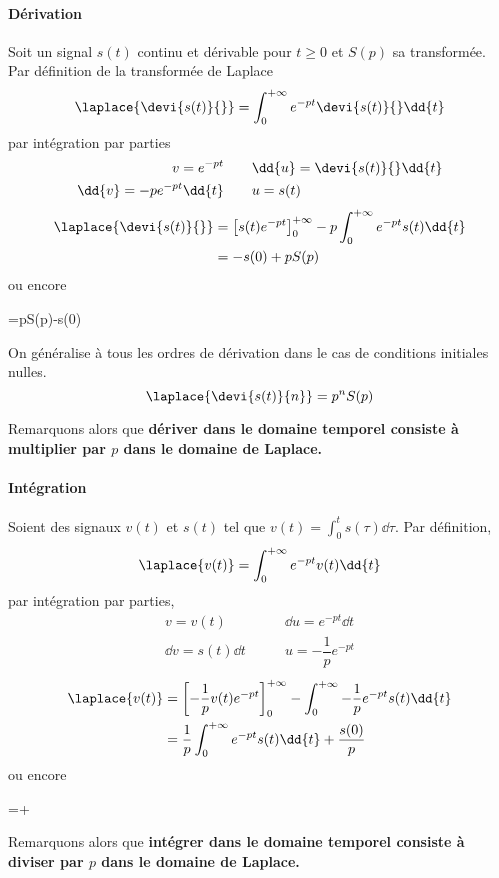 \paragraph{Dérivation}
Soit un signal $s(t)$ continu et dérivable pour $t\ge0$ et $S(p)$ sa transformée.
Par définition de la transformée de Laplace 
$$
\laplace{\devi{s(t)}{}}=\int_{0}^{+\infty} e^{-pt}\devi{s(t)}{}\dd{t}
$$
par intégration par parties
\begin{align*}
    v=e^{-pt}\qquad&\dd{u}=\devi{s(t)}{}\dd{t}\\
    \dd{v}=-pe^{-pt}\dd{t}\qquad&u=s(t)
\end{align*}
\begin{align*}
    \laplace{\devi{s(t)}{}}&=\left[s(t)e^{-pt}\right]_0^{+\infty}-p\int_{0}^{+\infty} e^{-pt}s(t)\dd{t} \\
                           &=-s(0)+pS(p)
\end{align*}
ou encore
\begin{bequation}
    =pS(p)-s(0)
\end{bequation}
On généralise à tous les ordres de dérivation dans le cas de conditions initiales nulles.
$$
\laplace{\devi{s(t)}{n}}=p^nS(p)
$$

Remarquons alors que \textbf{dériver dans le domaine temporel consiste à multiplier par 
$p$ dans le domaine de Laplace.}
\paragraph{Intégration}
Soient  des signaux $v(t)$ et $s(t)$ tel que $v(t)=\int_{0}^{t}s(\tau)\dd{\tau}$. 
Par définition,
$$
\laplace{v(t)}=\int_{0}^{+\infty} e^{-pt}v(t)\dd{t}
$$
par intégration par parties,
\begin{align*}
    v=v(t)\qquad&\dd{u}=e^{-pt}\dd{t}\\
    \dd{v}=s(t)\dd{t}\qquad&u=-\dfrac{1}{p}e^{-pt}
\end{align*} 
\begin{align*}
    \laplace{v(t)}&=\left[-\dfrac{1}{p}v(t)e^{-pt}\right]_0^{+\infty}-\int_{0}^{+\infty} -\dfrac{1}{p}e^{-pt}s(t)\dd{t} \\
    &=\dfrac{1}{p}\int_{0}^{+\infty} e^{-pt}s(t)\dd{t}+\dfrac{s(0)}{p}
\end{align*}
ou encore
\begin{bequation}
    =+
\end{bequation}
Remarquons alors que \textbf{intégrer dans le domaine temporel consiste à diviser par $p$ 
dans le domaine de Laplace.}

